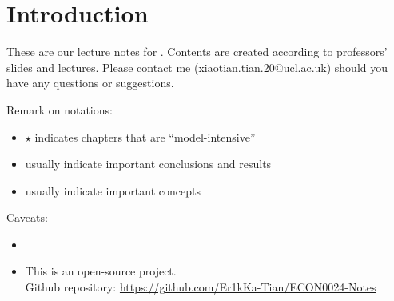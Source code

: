 \chapter*{Introduction}
These are our  lecture notes for . Contents are created according to professors' slides and lectures. Please contact me  (xiaotian.tian.20@ucl.ac.uk) should you have any questions or suggestions.

Remark on notations:
\begin{itemize}
    \item $\star$ indicates chapters that are ``model-intensive''
    \item {} usually indicate important conclusions and results
    \item {} usually indicate important concepts
\end{itemize}

Caveats:
\begin{itemize}
    \item {}
    \item This is an open-source project.\\Github repository: \url{https://github.com/Er1kKa-Tian/ECON0024-Notes}
\end{itemize}



\iffalse
    \begin{figure}[H]
        \centering
        \texttt{[image: images/102115356\_p0.jpg]}
        \caption{Enjoy this lovely picture before we start!}
        \label{fig:Introduction}
    \end{figure}
\fi